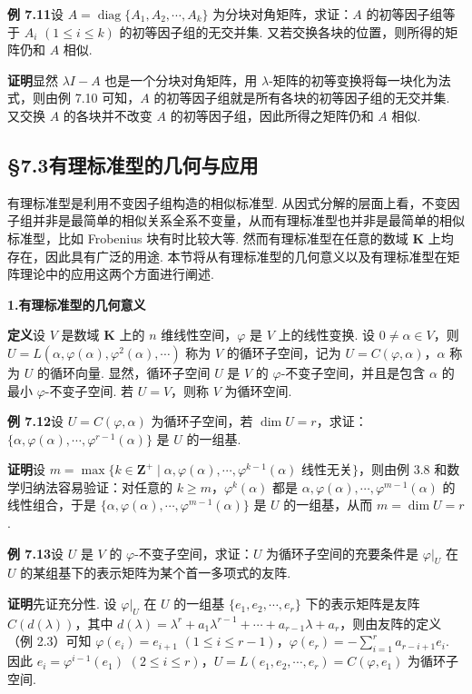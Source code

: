 \documentclass[UTF8,12pt,a4paper,fontset=fandol]{ctexart}
\begin{document}
\noindent\textbf{例 7.11}\quad 设 $A=\operatorname{diag}\{A_1,A_2,\cdots,A_k\}$ 为分块对角矩阵，求证：$A$ 的初等因子组等于 $A_i$ $(1\le i\le k)$ 的初等因子组的无交并集. 又若交换各块的位置，则所得的矩阵仍和 $A$ 相似.

\noindent\textbf{证明}\quad 显然 $\lambda I-A$ 也是一个分块对角矩阵，用 $\lambda$-矩阵的初等变换将每一块化为法式，则由例 7.10 可知，$A$ 的初等因子组就是所有各块的初等因子组的无交并集. 又交换 $A$ 的各块并不改变 $A$ 的初等因子组，因此所得之矩阵仍和 $A$ 相似.

\subsection*{§7.3\quad 有理标准型的几何与应用}

有理标准型是利用不变因子组构造的相似标准型. 从因式分解的层面上看，不变因子组并非是最简单的相似关系全系不变量，从而有理标准型也并非是最简单的相似标准型，比如 Frobenius 块有时比较大等. 然而有理标准型在任意的数域 $\mathbf{K}$ 上均存在，因此具有广泛的用途. 本节将从有理标准型的几何意义以及有理标准型在矩阵理论中的应用这两个方面进行阐述.

\noindent\textbf{1.\quad 有理标准型的几何意义}

\noindent\textbf{定义}\quad 设 $V$ 是数域 $\mathbf{K}$ 上的 $n$ 维线性空间，$\varphi$ 是 $V$ 上的线性变换. 设 $0\ne\alpha\in V$，则 $U=L(\alpha,\varphi(\alpha),\varphi^2(\alpha),\cdots)$ 称为 $V$ 的循环子空间，记为 $U=C(\varphi,\alpha)$，$\alpha$ 称为 $U$ 的循环向量. 显然，循环子空间 $U$ 是 $V$ 的 $\varphi$-不变子空间，并且是包含 $\alpha$ 的最小 $\varphi$-不变子空间. 若 $U=V$，则称 $V$ 为循环空间.

\noindent\textbf{例 7.12}\quad 设 $U=C(\varphi,\alpha)$ 为循环子空间，若 $\dim U=r$，求证：$\{\alpha,\varphi(\alpha),\cdots,\varphi^{r-1}(\alpha)\}$ 是 $U$ 的一组基.

\noindent\textbf{证明}\quad 设 $m=\max\{k\in\mathbf{Z}^+\mid \alpha,\varphi(\alpha),\cdots,\varphi^{k-1}(\alpha)\text{ 线性无关}\}$，则由例 3.8 和数学归纳法容易验证：对任意的 $k\ge m$，$\varphi^k(\alpha)$ 都是 $\alpha,\varphi(\alpha),\cdots,\varphi^{m-1}(\alpha)$ 的线性组合，于是 $\{\alpha,\varphi(\alpha),\cdots,\varphi^{m-1}(\alpha)\}$ 是 $U$ 的一组基，从而 $m=\dim U=r$.

\noindent\textbf{例 7.13}\quad 设 $U$ 是 $V$ 的 $\varphi$-不变子空间，求证：$U$ 为循环子空间的充要条件是 $\varphi|_U$ 在 $U$ 的某组基下的表示矩阵为某个首一多项式的友阵.

\noindent\textbf{证明}\quad 先证充分性. 设 $\varphi|_U$ 在 $U$ 的一组基 $\{e_1,e_2,\cdots,e_r\}$ 下的表示矩阵是友阵 $C(d(\lambda))$，其中 $d(\lambda)=\lambda^r+a_1\lambda^{r-1}+\cdots+a_{r-1}\lambda+a_r$，则由友阵的定义（例 2.3）可知 $\varphi(e_i)=e_{i+1}$ $(1\le i\le r-1)$，$\varphi(e_r)=-\sum\limits_{i=1}^r a_{r-i+1}e_i$. 因此 $e_i=\varphi^{i-1}(e_1)$ $(2\le i\le r)$，$U=L(e_1,e_2,\cdots,e_r)=C(\varphi,e_1)$ 为循环子空间.
\end{document}
